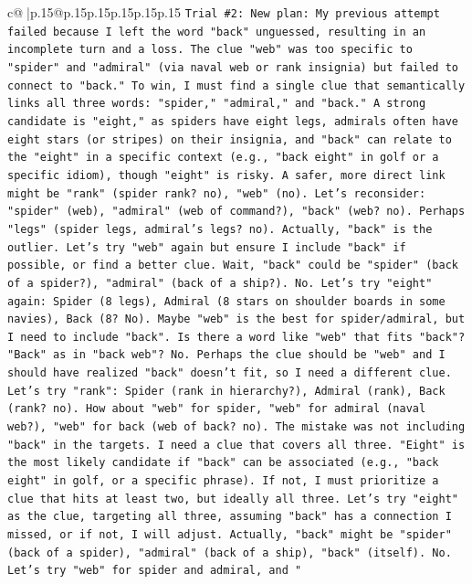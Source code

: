 \documentclass{article}
\begin{document}
{\begin{supertabular}{c@{$\;$}|p{.15\linewidth}@{}p{.15\linewidth}p{.15\linewidth}p{.15\linewidth}p{.15\linewidth}p{.15\linewidth}}
{{{\texttt{Trial \#2: New plan: My previous attempt failed because I left the word "back" unguessed, resulting in an incomplete turn and a loss. The clue "web" was too specific to "spider" and "admiral" (via naval web or rank insignia) but failed to connect to "back." To win, I must find a single clue that semantically links all three words: "spider," "admiral," and "back." A strong candidate is "eight," as spiders have eight legs, admirals often have eight stars (or stripes) on their insignia, and "back" can relate to the "eight" in a specific context (e.g., "back eight" in golf or a specific idiom), though "eight" is risky. A safer, more direct link might be "rank" (spider rank? no), "web" (no). Let's reconsider: "spider" (web), "admiral" (web of command?), "back" (web? no). Perhaps "legs" (spider legs, admiral's legs? no). Actually, "back" is the outlier. Let's try "web" again but ensure I include "back" if possible, or find a better clue. Wait, "back" could be "spider" (back of a spider?), "admiral" (back of a ship?). No. Let's try "eight" again: Spider (8 legs), Admiral (8 stars on shoulder boards in some navies), Back (8? No). Maybe "web" is the best for spider/admiral, but I need to include "back". Is there a word like "web" that fits "back"? "Back" as in "back web"? No. Perhaps the clue should be "web" and I should have realized "back" doesn't fit, so I need a different clue. Let's try "rank": Spider (rank in hierarchy?), Admiral (rank), Back (rank? no). How about "web" for spider, "web" for admiral (naval web?), "web" for back (web of back? no). The mistake was not including "back" in the targets. I need a clue that covers all three. "Eight" is the most likely candidate if "back" can be associated (e.g., "back eight" in golf, or a specific phrase). If not, I must prioritize a clue that hits at least two, but ideally all three. Let's try "eight" as the clue, targeting all three, assuming "back" has a connection I missed, or if not, I will adjust. Actually, "back" might be "spider" (back of a spider), "admiral" (back of a ship), "back" (itself). No. Let's try "web" for spider and admiral, and "} \\
\\ 
}}}
\end{supertabular}}
\end{document}
